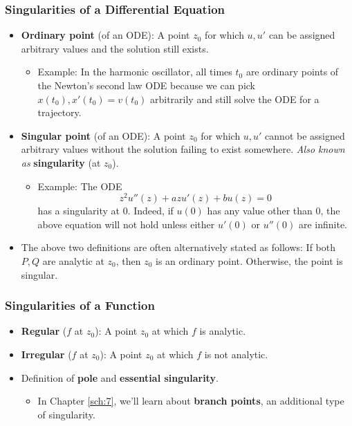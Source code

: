 \documentclass[../finalProject.tex]{subfiles}
\begin{document}
\subsubsection{Singularities of a Differential Equation}
\begin{itemize}
    \item \textbf{Ordinary point} (of an ODE): A point $z_0$ for which $u,u'$ can be assigned arbitrary values and the solution still exists.
    \begin{itemize}
        \item Example: In the harmonic oscillator, all times $t_0$ are ordinary points of the Newton's second law ODE because we can pick $x(t_0),x'(t_0)=v(t_0)$ arbitrarily and still solve the ODE for a trajectory.
    \end{itemize}
    \item \textbf{Singular point} (of an ODE): A point $z_0$ for which $u,u'$ cannot be assigned arbitrary values without the solution failing to exist somewhere. \emph{Also known as} \textbf{singularity} (at $z_0$).
    \begin{itemize}
        \item Example: The ODE
        \begin{equation*}
            z^2u''(z)+azu'(z)+bu(z) = 0
        \end{equation*}
        has a singularity at 0. Indeed, if $u(0)$ has any value other than 0, the above equation will not hold unless either $u'(0)$ or $u''(0)$ are infinite.
    \end{itemize}
    \item The above two definitions are often alternatively stated as follows: If both $P,Q$ are analytic at $z_0$, then $z_0$ is an ordinary point. Otherwise, the point is singular.
\end{itemize}

\subsubsection{Singularities of a Function}
\begin{itemize}
    \item \textbf{Regular} ($f$ at $z_0$): A point $z_0$ at which $f$ is analytic.
    \item \textbf{Irregular} ($f$ at $z_0$): A point $z_0$ at which $f$ is not analytic.
    \item Definition of \textbf{pole} and \textbf{essential singularity}.
    \begin{itemize}
        \item In Chapter \ref{sch:7}, we'll learn about \textbf{branch points}, an additional type of singularity.
    \end{itemize}
\end{itemize}
\end{document}
